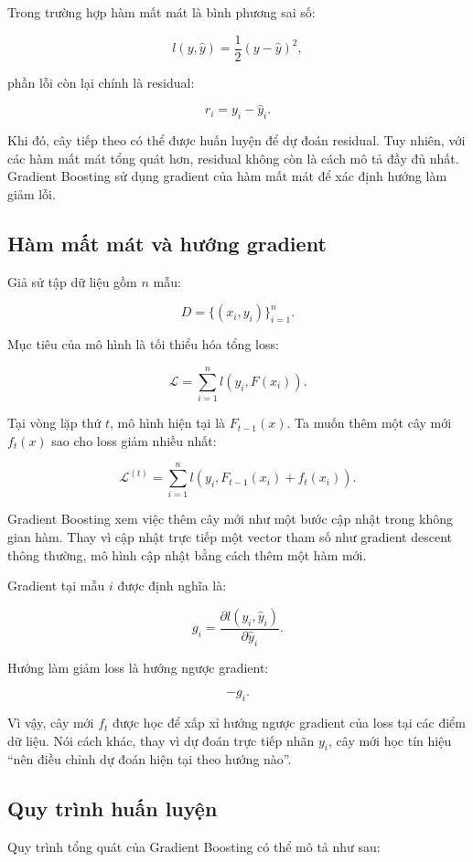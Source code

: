 Trong trường hợp hàm mất mát là bình phương sai số:

\[
l(y, \hat{y}) = \frac{1}{2}(y - \hat{y})^2,
\]

phần lỗi còn lại chính là residual:

\[
r_i = y_i - \hat{y}_i.
\]

Khi đó, cây tiếp theo có thể được huấn luyện để dự đoán residual. Tuy nhiên, với các hàm mất mát tổng quát hơn, residual không còn là cách mô tả đầy đủ nhất. Gradient Boosting sử dụng gradient của hàm mất mát để xác định hướng làm giảm lỗi.

\subsection{Hàm mất mát và hướng gradient}

Giả sử tập dữ liệu gồm $n$ mẫu:

\[
D = \{(x_i, y_i)\}_{i=1}^{n}.
\]

Mục tiêu của mô hình là tối thiểu hóa tổng loss:

\[
\mathcal{L} = \sum_{i=1}^{n} l(y_i, F(x_i)).
\]

Tại vòng lặp thứ $t$, mô hình hiện tại là $F_{t-1}(x)$. Ta muốn thêm một cây mới $f_t(x)$ sao cho loss giảm nhiều nhất:

\[
\mathcal{L}^{(t)}
=
\sum_{i=1}^{n}
l(y_i, F_{t-1}(x_i) + f_t(x_i)).
\]

Gradient Boosting xem việc thêm cây mới như một bước cập nhật trong không gian hàm. Thay vì cập nhật trực tiếp một vector tham số như gradient descent thông thường, mô hình cập nhật bằng cách thêm một hàm mới.

Gradient tại mẫu $i$ được định nghĩa là:

\[
g_i =
\frac{\partial l(y_i, \hat{y}_i)}
{\partial \hat{y}_i}.
\]

Hướng làm giảm loss là hướng ngược gradient:

\[
-g_i.
\]

Vì vậy, cây mới $f_t$ được học để xấp xỉ hướng ngược gradient của loss tại các điểm dữ liệu. Nói cách khác, thay vì dự đoán trực tiếp nhãn $y_i$, cây mới học tín hiệu ``nên điều chỉnh dự đoán hiện tại theo hướng nào''.

\subsection{Quy trình huấn luyện}

Quy trình tổng quát của Gradient Boosting có thể mô tả như sau:

